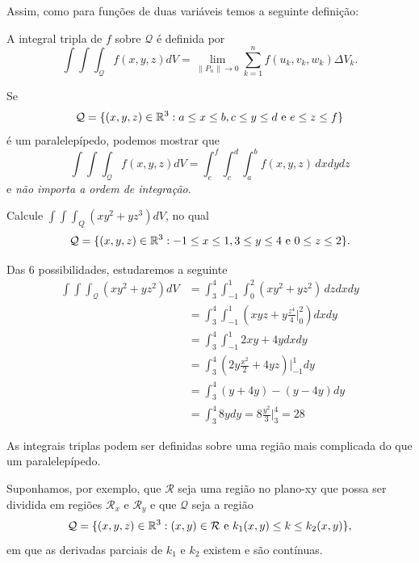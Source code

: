Assim, como para funções de duas variáveis temos a seguinte definição:

\begin{definition}
    A integral tripla de \(f\) sobre \(\mathcal{Q}\) é definida por \[\int\int\int_\mathcal{Q} f(x,y,z) dV = \lim_{\|P_n\|\to 0} \sum_{k=1}^{n} f(u_k,v_k,w_k)\Delta V_k.\]
\end{definition}

\begin{remark}
    Se \[\mathcal{Q} = \{(x,y,z)\in\mathbb{R}^3 : a\leq x \leq b, c\leq y\leq d \text{ e } e\leq z\leq f\}\] é um paralelepípedo, podemos mostrar que \[\int\int\int_\mathcal{Q} f(x,y,z) dV = \int_e^f \int_c^d \int_a^b f(x,y,z)\, dx dy dz\] e \textit{não importa a ordem de integração}.
\end{remark}

\begin{example}
    Calcule \(\int\int\int_Q (xy^2 + yz^3) dV\), no qual \[\mathcal{Q} = \{(x,y,z)\in\mathbb{R}^3 : -1\leq x \leq 1, 3\leq y\leq 4 \text{ e } 0\leq z\leq 2\}.\]

    Das 6 possibilidades, estudaremos a seguinte
        \begin{align*}
            \int\int\int_\mathcal{Q} (xy^2 + yz^2) dV
                & = \int_3^4 \int_{-1}^1 \int_0^2 (xy^2 + yz^2)\, dz dx dy \\
                & = \int_3^4 \int_{-1}^1 \left( xyz + y \frac{z^4}{4}\bigg|_0^2 \right) dx dy \\
                & = \int_3^4 \int_{-1}^1 2xy + 4y dxdy \\
                & = \int_3^4 \left( 2y\frac{x^2}{2} + 4yz \right)\bigg|_{-1}^{1} dy \\
                & = \int_3^4 (y + 4y) - (y -4y) dy \\
                & = \int_3^4 8y dy = 8 \frac{y^2}{3}\bigg|_3^4 = 28
        \end{align*}
\end{example}

As integrais triplas podem ser definidas sobre uma região mais complicada do que um paralelepípedo.

Suponhamos, por exemplo, que \(\mathcal{R}\) seja uma região no plano-xy que possa ser dividida em regiões \(\mathcal{R}_x\) e \(\mathcal{R}_y\) e que \(\mathcal{Q}\) seja a região \[\mathcal{Q} = \{(x,y,z)\in\mathbb{R}^3 : (x,y)\in\mathcal{R} \text{ e } k_1(x,y) \leq k \leq k_2(x,y)\},\] em que as derivadas parciais de \(k_1\) e \(k_2\) existem e são contínuas.

